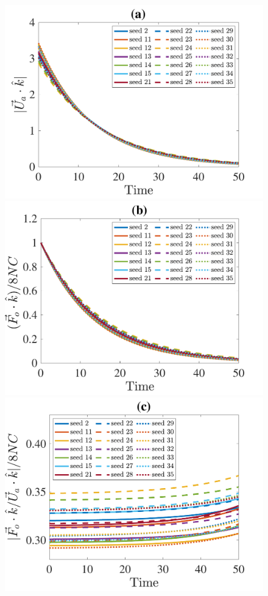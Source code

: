 \begin{figure}[ht]
	\begin{center}
		\includegraphics[scale=1]{./figures/fig_NC50_sd_Ua3_all.pdf}
		\includegraphics[scale=1]{./figures/fig_NC50_sd_Fo3_all}
		\includegraphics[scale=1]{./figures/fig_NC50_sd_Fo3Ua_ratio}

\end{center}
\end{figure}
